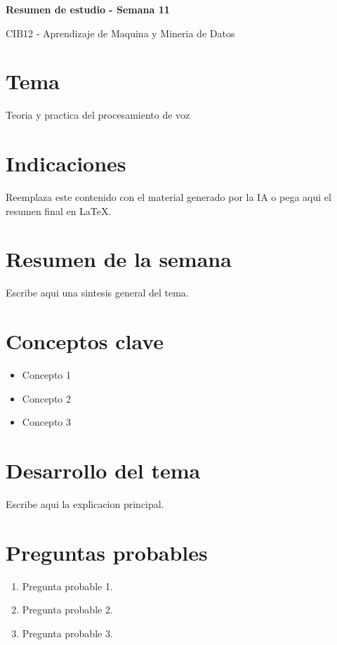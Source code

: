 \documentclass[8pt,a4paper,twocolumn]{article}
\newcommand{\resumentitulo}{Resumen de estudio - Semana 11}
\begin{document}
\vspace*{-1.0em}
\begin{tcolorbox}[colback=black!12,colframe=black!35,boxrule=0.3pt,arc=1pt,left=4pt,right=4pt,top=3pt,bottom=3pt]
{\bfseries\normalsize \resumentitulo\par}
{\scriptsize CIB12 - Aprendizaje de Maquina y Mineria de Datos\par}
\end{tcolorbox}
\vspace{0.15em}

\section*{Tema}
Teoria y practica del procesamiento de voz

\section*{Indicaciones}
Reemplaza este contenido con el material generado por la IA o pega aqui el resumen final en LaTeX.

\section*{Resumen de la semana}
Escribe aqui una sintesis general del tema.

\section*{Conceptos clave}
\begin{itemize}
    \item Concepto 1
    \item Concepto 2
    \item Concepto 3
\end{itemize}

\section*{Desarrollo del tema}
Escribe aqui la explicacion principal.

\section*{Preguntas probables}
\begin{enumerate}
    \item Pregunta probable 1.
    \item Pregunta probable 2.
    \item Pregunta probable 3.
\end{enumerate}
\end{document}
